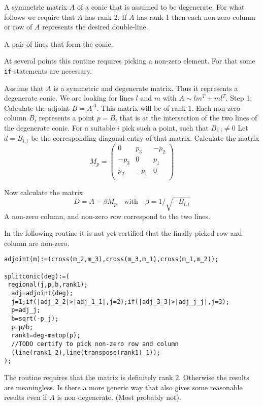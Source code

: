 \documentclass[11pt]{article}
\begin{document}
 
\medskip
{} A symmetric matrix $A$ of a conic that is assumed to be degenerate. For what follows we require that $A$ has rank 2.
If $A$ has rank 1 then each non-zero column or row of $A$ represents the desired double-line.


\medskip
{} A pair of lines that form the conic. 

\medskip
{}
At several points this routine requires picking a non-zero element. For that some {\tt if}-statements are necessary.

\medskip
{}
Assume that $A$ is a symmetric and degenerate matrix. Thus it represents a degenerate conic.
We are looking for lines $l$ and $m$ with $A\sim lm^T+ml^T$.
Step 1: Calculate the adjoint $B=A^\Delta$. This matrix will be of rank 1. Each non-zero column $B_i$ represents a point $p=B_i$ that 
is at the intersection of the two lines of the degenerate conic. For a suitable $i$ pick such a point, such that $B_{i,i}\neq 0$
Let $d=B_{i,i}$ be the corresponding diagonal entry of that matrix. Calculate the matrix 
\[
M_p=\begin{pmatrix}
0&p_3&-p_2\\
-p_3&0&p_1\\
p_2&-p_1&0\\
\end{pmatrix}
\]

\noindent
Now calculate the matrix
\[D=A-\beta M_p \mathrm{\quad with \quad} \beta=1/\sqrt{-B_{i,i}}\]
A non-zero column, and non-zero row correspond to the two lines.

\medskip
{}
In the following routine it is not yet certified that the finally picked 
row and column are non-zero.

\begin{verbatim}
adjoint(m):=(cross(m_2,m_3),cross(m_3,m_1),cross(m_1,m_2));

splitconic(deg):=(
 regional(j,p,b,rank1);
  adj=adjoint(deg);
  j=1;if(|adj_2_2|>|adj_1_1|,j=2);if(|adj_3_3|>|adj_j_j|,j=3);
  p=adj_j;
  b=sqrt(-p_j);
  p=p/b;
  rank1=deg-matop(p);
  //TODO certify to pick non-zero row and column
  (line(rank1_2),line(transpose(rank1)_1));
);
\end{verbatim}

 \medskip
{}
The routine requires that the matrix is definitely rank 2. Otherwise the results are meaningless.
Is there a more generic way that also gives some reasonable results even if $A$ is non-degenerate. (Most probably not).
\end{document}
